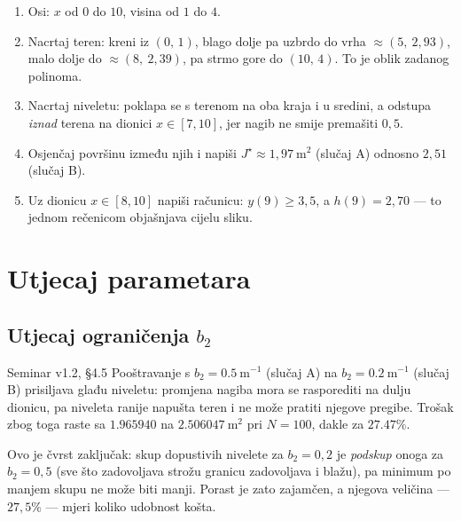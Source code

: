 \begin{ploca}
\begin{enumerate}[leftmargin=*]
  \item Osi: $x$ od $0$ do $10$, visina od $1$ do $4$.
  \item Nacrtaj teren: kreni iz $(0,\,1)$, blago dolje pa uzbrdo do vrha
        $\approx (5,\ 2{,}93)$, malo dolje do $\approx (8,\ 2{,}39)$, pa strmo
        gore do $(10,\,4)$. To je oblik zadanog polinoma.
  \item Nacrtaj niveletu: poklapa se s terenom na oba kraja i u sredini, a
        odstupa \emph{iznad} terena na dionici $x \in [7, 10]$, jer nagib ne
        smije premašiti $0{,}5$.
  \item Osjenčaj površinu između njih i napiši $J^{\star} \approx 1{,}97\ \mathrm{m}^2$
        (slučaj A) odnosno $2{,}51$ (slučaj B).
  \item Uz dionicu $x \in [8,10]$ napiši računicu: $y(9) \geq 3{,}5$, a
        $h(9) = 2{,}70$ --- to jednom rečenicom objašnjava cijelu sliku.
\end{enumerate}
\end{ploca}

\section{Utjecaj parametara}
\label{sec:z3-analiza}

\subsection{Utjecaj ograničenja $b_2$}

\begin{seminar}{Seminar v1.2, §4.5}
Pooštravanje s $b_2 = 0.5\ \mathrm{m}^{-1}$ (slučaj A) na $b_2 = 0.2\ \mathrm{m}^{-1}$
(slučaj B) prisiljava glađu niveletu: promjena nagiba mora se rasporediti na
dulju dionicu, pa niveleta ranije napušta teren i ne može pratiti njegove
pregibe. Trošak zbog toga raste sa $1.965940$ na $2.506047\ \mathrm{m}^2$ pri
$N = 100$, dakle za $27.47\%$.
\end{seminar}

Ovo je čvrst zaključak: skup dopustivih nivelete za $b_2 = 0{,}2$ je
\emph{podskup} onoga za $b_2 = 0{,}5$ (sve što zadovoljava strožu granicu
zadovoljava i blažu), pa minimum po manjem skupu ne može biti manji. Porast je
zato zajamčen, a njegova veličina --- $27{,}5\%$ --- mjeri koliko udobnost košta.

